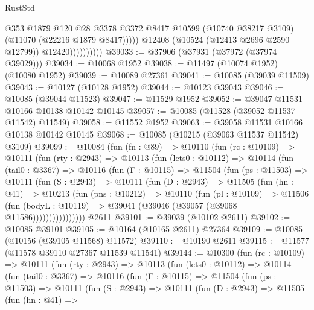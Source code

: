 \begin{lexlean}{RustStd}
\begin{coremodule}
                              @353
                              @1879
                              @120
                              @28
                              @3378
                              @3372
                              @8417
                              @10599
                              (@10740 @38217 @3109)
                              (@11070 (@22216 @1879 @8417)))))
                        @12408
                        (@10524 (@12413 @2696 @2590 @12799))
                        @12420))))))))))
@39033 := @37906 (@37931 (@37972 (@37974 @39029)))
@39034 := @10068 @1952
@39038 := @11497 (@10074 @1952) (@10080 @1952)
@39039 := @10089 @27361
@39041 := @10085 (@39039 @11509)
@39043 := @10127 (@10128 @1952)
@39044 := @10123 @39043
@39046 := @10085 (@39044 @11523)
@39047 := @11529 @1952
@39052 := @39047 @11531 @10166 @10138 @10142 @10145
@39057 := @10085 (@11528 (@39052 @11537 @11542) @11549)
@39058 := @11552 @1952
@39063 := @39058 @11531 @10166 @10138 @10142 @10145
@39068 := @10085 (@10215 (@39063 @11537 @11542) @3109)
@39099 := @10084
    (fun (fn : @89) =>
    @10110
      (fun (rc : @10109) =>
      @10111
        (fun (rty : @2943) =>
        @10113
          (fun (lets0 : @10112) =>
          @10114
            (fun (tail0 : @3367) =>
            @10116
              (fun (Γ : @10115) =>
              @11504
                (fun (ps : @11503) =>
                @10111
                  (fun (S : @2943) =>
                  @10111
                    (fun (D : @2943) =>
                    @11505
                      (fun (hn : @41) =>
                      @10213
                        (fun (pns : @10212) =>
                        @10110
                          (fun (pl : @10109) =>
                          @11506
                            (fun (bodyL : @10119) =>
                            @39041 (@39046 (@39057 (@39068 @11586))))))))))))))))
    @2611
@39101 := @39039 (@10102 @2611)
@39102 := @10085 @39101
@39105 := @10164 (@10165 @2611) @27364
@39109 := @10085 (@10156 (@39105 @11568) @11572)
@39110 := @10190 @2611
@39115 := @11577 (@11578 @39110 @27367 @11539 @11541)
@39144 := @10300
    (fun (rc : @10109) =>
    @10111
      (fun (rty : @2943) =>
      @10113
        (fun (lets0 : @10112) =>
        @10114
          (fun (tail0 : @3367) =>
          @10116
            (fun (Γ : @10115) =>
            @11504
              (fun (ps : @11503) =>
              @10111
                (fun (S : @2943) =>
                @10111
                  (fun (D : @2943) =>
                  @11505
                    (fun (hn : @41) =>

\end{coremodule}
\end{lexlean}
